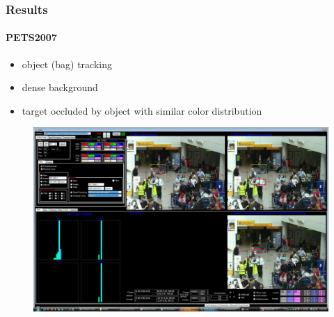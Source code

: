 \begin{frame}
\frametitle{Results}
\framesubtitle{PETS2007} 
\logoCSIPCPL\mypagenum
	\begin{itemize}
		\item object (bag) tracking
		\item dense background
		\item target occluded by object with similar color distribution
	\end{itemize}
	\begin{figure}
		\includegraphics[width=1.0\textwidth]{figs/ICIP2009_PETS2007_FN_00340_snapshotVVG.pdf}
	\end{figure}
\end{frame}






